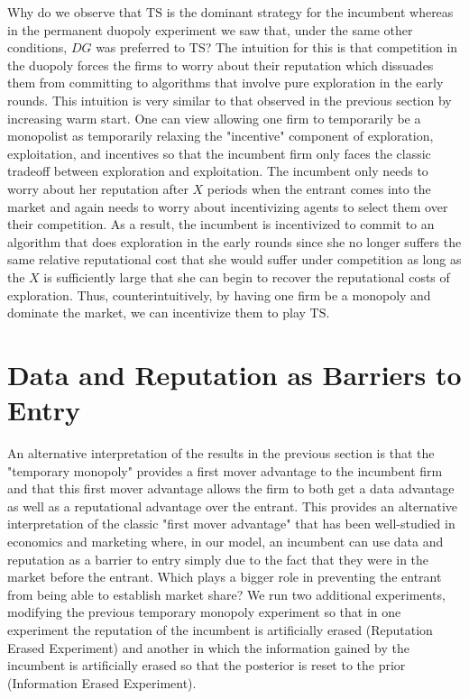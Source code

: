 \documentclass[letterpaper]{article}
\theoremstyle{definition}
\newcommand{\TS}{\mathrm{TS}}
\begin{document}
Why do we observe that $\TS$ is the dominant strategy for the incumbent whereas in the permanent duopoly experiment we saw that, under the same other conditions, $DG$ was preferred to $\TS$? The intuition for this is that competition in the duopoly forces the firms to worry about their reputation which dissuades them from committing to algorithms that involve pure exploration in the early rounds. This intuition is very similar to that observed in the previous section by increasing warm start. One can view allowing one firm to temporarily be a monopolist as temporarily relaxing the "incentive" component of exploration, exploitation, and incentives so that the incumbent firm only faces the classic tradeoff between exploration and exploitation. The incumbent only needs to worry about her reputation after $X$ periods when the entrant comes into the market and again needs to worry about incentivizing agents to select them over their competition. As a result, the incumbent is incentivized to commit to an algorithm that does exploration in the early rounds since she no longer suffers the same relative reputational cost that she would suffer under competition as long as the $X$ is sufficiently large that she can begin to recover the reputational costs of exploration. Thus, counterintuitively, by having one firm be a monopoly and dominate the market, we can incentivize them to play $\TS$.

\section{Data and Reputation as Barriers to Entry}\label{section:6}

An alternative interpretation of the results in the previous section is that the "temporary monopoly" provides a first mover advantage to the incumbent firm and that this first mover advantage allows the firm to both get a data advantage as well as a reputational advantage over the entrant. This provides an alternative interpretation of the classic "first mover advantage" that has been well-studied in economics and marketing \cite{kerin1992first} where, in our model, an incumbent can use data and reputation as a barrier to entry simply due to the fact that they were in the market before the entrant. Which plays a bigger role in preventing the entrant from being able to establish market share? We run two additional experiments, modifying the previous temporary monopoly experiment so that in one experiment the reputation of the incumbent is artificially erased (Reputation Erased Experiment) and another in which the information gained by the incumbent is artificially erased so that the posterior is reset to the prior (Information Erased Experiment).
\end{document}
